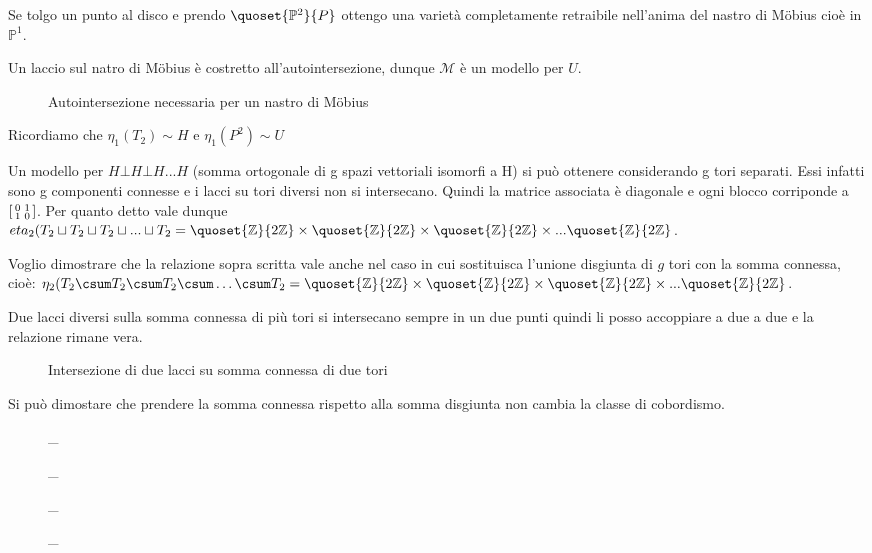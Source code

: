 Se tolgo un punto al disco e prendo $\quoset{\mathbb P^2}{P}$ ottengo una varietà completamente retraibile nell'anima del nastro di Möbius cioè in $\mathbb{P}^1$.

Un laccio sul natro di Möbius è costretto all'autointersezione, dunque $\mathcal{M}$ è un modello per $U$.

\begin{figure}
	\centering 
	
	\caption{Autointersezione necessaria per un nastro di Möbius}
\end{figure}

Ricordiamo che $\eta_1(T_{2}) \sim H$ e $\eta_1(P^{2}) \sim U$


Un modello per $H \bot H \bot H ... H$ (somma ortogonale di g spazi vettoriali isomorfi a H) si può ottenere considerando g tori separati. Essi infatti sono g componenti connesse e i lacci su tori diversi non si intersecano. Quindi la matrice associata è diagonale e ogni blocco corriponde a $\begin{bsmallmatrix} 0 & 1 \\ 1 & 0 \end{bsmallmatrix}$.
Per quanto detto vale dunque $eta_{2}(T_{2} \sqcup T_{2} \sqcup T_{2} \sqcup ... \sqcup T_{2} = \quoset{\mathbb{Z}}{2\mathbb{Z}} \times \quoset{\mathbb{Z}}{2\mathbb{Z}} \times \quoset{\mathbb{Z}}{2\mathbb{Z}} \times ... \quoset{\mathbb{Z}}{2\mathbb{Z}}$.

Voglio dimostrare che la relazione sopra scritta vale anche nel caso in cui sostituisca l'unione disgiunta di $g$ tori con la somma connessa, cioè: $\eta_{2}(T_{2} \csum T_{2} \csum T_{2} \csum \dots \csum T_{2} = \quoset{\mathbb{Z}}{2\mathbb{Z}} \times \quoset{\mathbb{Z}}{2\mathbb{Z}} \times \quoset{\mathbb{Z}}{2\mathbb{Z}} \times ... \quoset{\mathbb{Z}}{2\mathbb{Z}}$.

Due lacci diversi sulla somma connessa di più tori si intersecano sempre in un due punti quindi li posso accoppiare a due a due e la relazione rimane vera.

\begin{figure}
	\centering 
	
	\caption{Intersezione di due lacci su somma connessa di due tori}
\end{figure}

Si può dimostare che prendere la somma connessa rispetto alla somma disgiunta non cambia la classe di cobordismo. 

\begin{figure}
	\centering 
	
	\caption{\_}
\end{figure}

\begin{figure}
	\centering 
	
	\caption{\_}
\end{figure}

\begin{figure}
	\centering 
	
	\caption{\_}
\end{figure}

\begin{figure}
	\centering 
	
	\caption{\_}
\end{figure}

